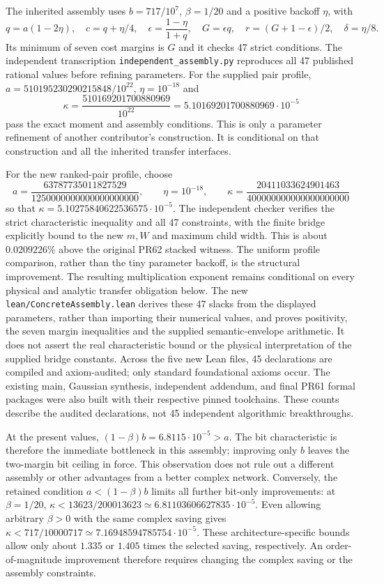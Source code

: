 \documentclass[11pt]{article}
\begin{document}
The inherited assembly uses $b=717/10^7$, $\beta=1/20$ and a positive
backoff $\eta$, with
\[
 q=a(1-2\eta),\quad c=q+\eta/4,\quad
 \epsilon=\frac{1-\eta}{1+q},\quad G=\epsilon q,
 \quad r=(G+1-\epsilon)/2,\quad \delta=\eta/8.
\]
Its minimum of seven cost margins is $G$ and it checks 47 strict conditions.
The independent transcription \texttt{independent\_assembly.py} reproduces
all 47 published rational values before refining parameters. For the supplied
pair profile, $a=510195230290215848/10^{22}$, $\eta=10^{-18}$ and
\begin{equation}\label{eq:refinement}
 \kappa=\frac{510169201700880969}{10^{22}}
       =5.10169201700880969\cdot10^{-5}
\end{equation}
pass the exact moment and assembly conditions. This is only a parameter
refinement of another contributor's construction. It is conditional on that
construction and all the inherited transfer interfaces.

For the new ranked-pair profile, choose
\[
 a=\frac{63787735011827529}{1250000000000000000000},\qquad
 \eta=10^{-18},\qquad
 \boxed{\kappa=\frac{20411033624901463}{400000000000000000000}}
\]
so that $\kappa=5.10275840622536575\cdot10^{-5}$.
The independent checker verifies the strict characteristic inequality and
all 47 constraints, with the finite bridge explicitly bound to the new
$m,W$ and maximum child width. This is about $0.0209226\%$ above the
original PR62 stacked witness. The uniform profile comparison, rather than
the tiny parameter backoff, is the structural improvement.
The resulting multiplication exponent remains conditional on every
physical and analytic transfer obligation below.
The new \texttt{lean/ConcreteAssembly.lean} derives these 47 slacks from
the displayed parameters, rather than importing their numerical values,
and proves positivity, the seven margin inequalities and the supplied
semantic-envelope arithmetic. It does not assert the real characteristic
bound or the physical interpretation of the supplied bridge constants.
Across the five new Lean files, 45 declarations are compiled and axiom-audited;
only standard foundational axioms occur. The existing main, Gaussian
synthesis, independent addendum, and final PR61 formal packages were also
built with their respective pinned toolchains. These counts describe the
audited declarations, not 45 independent algorithmic breakthroughs.

At the present values, $(1-\beta)b=6.8115\cdot10^{-5}>a$.
The bit characteristic is therefore the immediate bottleneck in this
assembly; improving only $b$ leaves the two-margin bit ceiling in force.
This observation does not rule out a different assembly or other advantages
from a better complex network.
Conversely, the retained condition $a<(1-\beta)b$ limits all further
bit-only improvements: at $\beta=1/20$,
$\kappa<13623/200013623\simeq6.81103606627835\cdot10^{-5}$.
Even allowing arbitrary $\beta>0$ with the same complex saving gives
$\kappa<717/10000717\simeq7.16948594785754\cdot10^{-5}$.
These architecture-specific bounds allow only about $1.335$ or $1.405$
times the selected saving, respectively. An order-of-magnitude improvement
therefore requires changing the complex saving or the assembly constraints.
\end{document}
